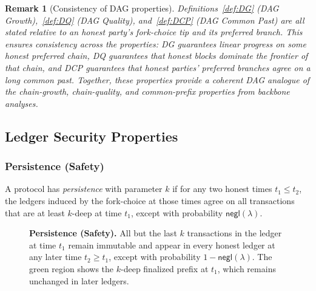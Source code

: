 \documentclass[11pt]{article}
\newtheorem{remark}[theorem]{Remark}
\newcommand{\negl}{\ensuremath{\mathsf{negl}}\xspace}
\begin{document}
\begin{remark}[Consistency of DAG properties]
Definitions~\ref{def:DG} (DAG Growth),~\ref{def:DQ} (DAG Quality), and~\ref{def:DCP} (DAG Common Past) are all stated relative to an honest party’s fork-choice tip and its preferred branch. This ensures consistency across the properties: \emph{DG} guarantees linear progress on some honest preferred chain, \emph{DQ} guarantees that honest blocks dominate the frontier of that chain, and \emph{DCP} guarantees that honest parties’ preferred branches agree on a long common past. Together, these properties provide a coherent DAG analogue of the chain-growth, chain-quality, and common-prefix properties from backbone analyses.
\end{remark}



\newpage
\subsection{Ledger Security Properties}

\subsubsection{Persistence (Safety)}
A protocol has \emph{persistence} with parameter $k$ if for any two honest times $t_1\le t_2$,
the ledgers induced by the fork-choice at those times agree on all transactions that are at least $k$-deep at time $t_1$,
except with probability $\negl(\lambda)$.


\begin{figure}[htp!]
\centering
{}
\caption{\textbf{Persistence (Safety).} 
\small 
All but the last $k$ transactions in the ledger at time $t_1$ remain immutable and appear in every honest ledger at any later time $t_2\ge t_1$, except with probability $1-\negl(\lambda)$. 
The green region shows the $k$-deep finalized prefix at $t_1$, which remains unchanged in later ledgers.}

\label{fig:persistence}
\end{figure}
\end{document}
